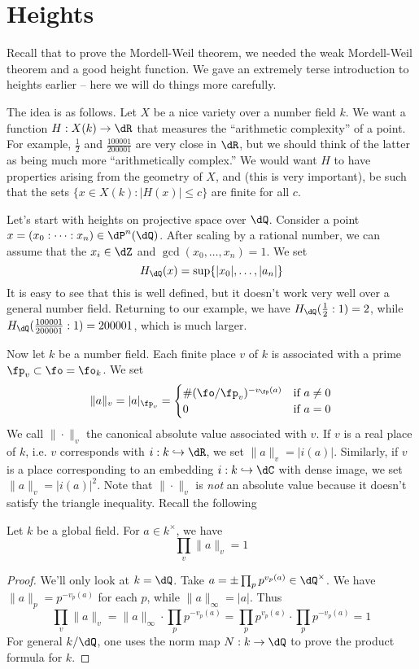 \documentclass{article}
\begin{document}
\section{Heights}\label{sec:heights}

Recall that to prove the Mordell-Weil theorem, we needed the weak Mordell-Weil 
theorem and a good height function. We gave an extremely terse introduction to 
heights earlier -- here we will do things more carefully. 

The idea is as follows. Let $X$ be a nice variety over a number field $k$. We 
want a function $H:X(k)\to \dR$ that measures the ``arithmetic complexity'' of 
a point. For example, $\frac 1 2$ and $\frac{100001}{200001}$ are very close in 
$\dR$, but we should think of the latter as being much more ``arithmetically 
complex.'' We would want $H$ to have properties arising from the geometry of 
$X$, and (this is very important), be such that the sets 
$\{x\in X(k):|H(x)|\leqslant c\}$ are finite for all $c$. 

Let's start with heights on projective space over $\dQ$. Consider a point 
$x=(x_0:\cdots:x_n)\in \dP^n(\dQ)$. After scaling by a rational number, we can 
assume that the $x_i\in \dZ$ and $\gcd(x_0,\dots,x_n)=1$. We set 
\[
  H_\dQ(x) = \sup\{|x_0|,\dots,|a_n|\}
\]
It is easy to see that this is well defined, but it doesn't work very well over 
a general number field. Returning to our example, we have 
$H_\dQ(\frac 1 2:1)=2$, while $H_\dQ(\frac{100001}{200001}:1)=200001$, which is 
much larger. 

Now let $k$ be a number field. Each finite place $v$ of $k$ is associated with 
a prime $\fp_v\subset \fo=\fo_k$. We set 
\[
  \|a\|_v = |a|_{\fp_v} 
        = \begin{cases}
            \#(\fo/\fp_v)^{-v_\fp(a)} & \text{if $a\ne 0$} \\
            0                         & \text{if $a=0$}
          \end{cases}
\]
We call $\|\cdot\|_v$ the canonical absolute value associated with $v$. If $v$ 
is a real place of $k$, i.e. $v$ corresponds with $i:k\hookrightarrow \dR$, we 
set $\|a\|_v = |i(a)|$. Similarly, if $v$ is a place corresponding to an 
embedding $i:k\hookrightarrow \dC$ with dense image, we set 
$\|a\|_v=|i(a)|^2$. Note that $\|\cdot\|_v$ is \emph{not} an absolute value 
because it doesn't satisfy the triangle inequality. Recall the following 

\begin{theorem}
Let $k$ be a global field. For $a\in k^\times$, we have 
\[
  \prod_v \|a\|_v = 1
\]
\end{theorem}
\begin{proof}
We'll only look at $k=\dQ$. Take $a=\pm \prod_p p^{v_p(a)}\in \dQ^\times$. We 
have $\|a\|_p=p^{-v_p(a)}$ for each $p$, while $\|a\|_\infty = |a|$. Thus
\[
  \prod_v \|a\|_v = \|a\|_\infty\cdot \prod_p p^{-v_p(a)}  = \prod_p p^{v_p(a)}\cdot \prod_p p^{-v_p(a)} = 1
\]
For general $k/\dQ$, one uses the norm map $N:k\to \dQ$ to prove the product 
formula for $k$.
\end{proof}
\end{document}
